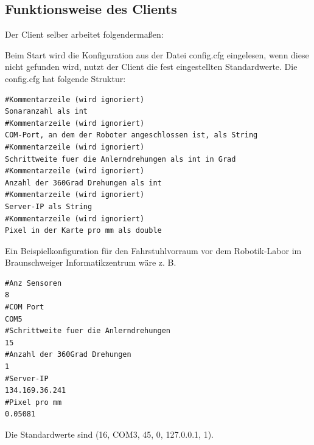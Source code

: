 \subsection{Funktionsweise des Clients}
\label{sec:funktionsweise}


Der Client selber arbeitet folgendermaßen:

Beim Start wird die Konfiguration aus der  Datei config.cfg eingelesen, wenn diese nicht gefunden
wird, nutzt der Client die fest eingestellten Standardwerte. Die config.cfg
hat folgende Struktur:

\begin{lstlisting}[language={},captionpos=b,caption={Aufbau der config.cfg},label={aufbau_config}]
#Kommentarzeile (wird ignoriert)
Sonaranzahl als int
#Kommentarzeile (wird ignoriert)
COM-Port, an dem der Roboter angeschlossen ist, als String
#Kommentarzeile (wird ignoriert)
Schrittweite fuer die Anlerndrehungen als int in Grad
#Kommentarzeile (wird ignoriert)
Anzahl der 360Grad Drehungen als int
#Kommentarzeile (wird ignoriert)
Server-IP als String
#Kommentarzeile (wird ignoriert)
Pixel in der Karte pro mm als double
\end{lstlisting}

Ein Beispielkonfiguration für den Fahrstuhlvorraum vor dem
Robotik-Labor im Braunschweiger Informatik\-zentrum wäre z. B.
\begin{lstlisting}[language={},captionpos=b,caption={Ein Beispiel für eine komplette config.cfg},label={beispiel_config}]
#Anz Sensoren
8
#COM Port
COM5
#Schrittweite fuer die Anlerndrehungen
15
#Anzahl der 360Grad Drehungen
1
#Server-IP
134.169.36.241
#Pixel pro mm
0.05081
\end{lstlisting}
Die Standardwerte sind (16, COM3, 45, 0, 127.0.0.1, 1).

